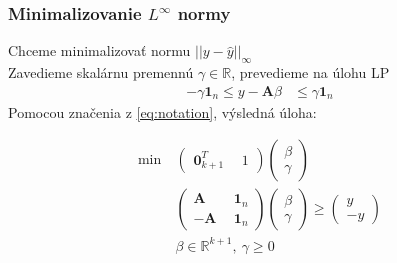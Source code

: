 \documentclass[presentation.tex]{subfiles}
\begin{document}
	\begin{frame}
		\frametitle{Minimalizovanie  $L^{\infty}$ normy}
		\text Chceme minimalizovať normu $||y - \hat{y}||_{\infty}$ \\
		\text Zavedieme skalárnu premennú $\gamma \in \mathbb{R}$, prevedieme na úlohu LP 
		\begin{align*}
			-\gamma \mathbf{1}_n \leq y - \mathbf{A} \beta &\leq \gamma \mathbf{1}_n
		\end{align*}
		\text Pomocou značenia z \eqref{eq:notation}, výsledná úloha:
		\begin{footnotesize}
			\begin{align*}
				\text{min}~ &
				\left(
				\begin{array}{c|c}
					\mathbf{0}_{k+1}^T ~&~ 1
				\end{array}
				\right)
				\left(
				\begin{array}{c}
					\beta \\
					\hline
					\gamma
				\end{array}
				\right) \\
				&\left(
				\begin{array}{c|c}
					\mathbf{A} ~&~ \mathbf{1}_n \\
					\hline
					-\mathbf{A} ~&~ \mathbf{1}_n
				\end{array}
				\right)
				\left(
				\begin{array}{c}
					\beta \\
					\hline
					\gamma
				\end{array}
				\right) 
				\geq
				\left(
				\begin{array}{c}
					y \\
					\hline
					-y
				\end{array}
				\right) \\
				&\beta \in \mathbb{R}^{k+1},~\gamma \geq 0 
			\end{align*}
		\end{footnotesize}
	\end{frame}
\end{document}
